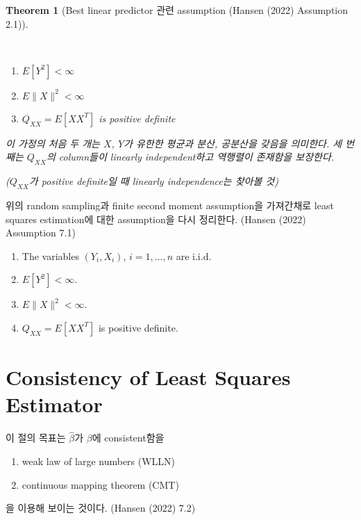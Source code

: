 \documentclass[
  letterpaper,
  DIV=11,
  numbers=noendperiod]{scrreprt}
\providecommand{\tightlist}{%
  \setlength{\itemsep}{0pt}\setlength{\parskip}{0pt}}\usepackage{longtable,booktabs,array}
\theoremstyle{definition}
\theoremstyle{plain}
\newtheorem{theorem}{Theorem}[chapter]
\theoremstyle{remark}
\begin{document}
\begin{theorem}[Best linear predictor 관련 assumption (Hansen (2022)
Assumption 2.1)]\protect\hypertarget{thm-blp}{}\label{thm-blp}

~

\begin{enumerate}
\def\labelenumi{\arabic{enumi}.}
\tightlist
\item
  \(E[Y^2]<\infty\)
\item
  \(E\|X\|^2 < \infty\)
\item
  \(Q_{XX} = E[XX^T]\) is positive definite
\end{enumerate}

이 가정의 처음 두 개는 \(X\), \(Y\)가 유한한 평균과 분산, 공분산을
갖음을 의미한다. 세 번째는 \(Q_{XX}\)의 column들이 linearly
independent하고 역행렬이 존재함을 보장한다.

(\(Q_{XX}\)가 positive definite일 때 linearly independence는 찾아볼 것)

\end{theorem}

위의 random sampling과 finite second moment assumption을 가져간채로
least squares estimation에 대한 assumption을 다시 정리한다. (Hansen
(2022) Assumption 7.1)

\begin{enumerate}
\def\labelenumi{\arabic{enumi}.}
\tightlist
\item
  The variables \((Y_i, X_i)\), \(i=1,\ldots, n\) are i.i.d.
\item
  \(E[Y^2]<\infty\).
\item
  \(E\|X\|^2<\infty\).
\item
  \(Q_{XX} = E[XX^T]\) is positive definite.
\end{enumerate}

\section{Consistency of Least Squares
Estimator}\label{consistency-of-least-squares-estimator}

이 절의 목표는 \(\hat{\beta}\)가 \(\beta\)에 consistent함을

\begin{enumerate}
\def\labelenumi{\arabic{enumi}.}
\tightlist
\item
  weak law of large numbers (WLLN)
\item
  continuous mapping theorem (CMT)
\end{enumerate}

을 이용해 보이는 것이다. (Hansen (2022) 7.2)
\end{document}
